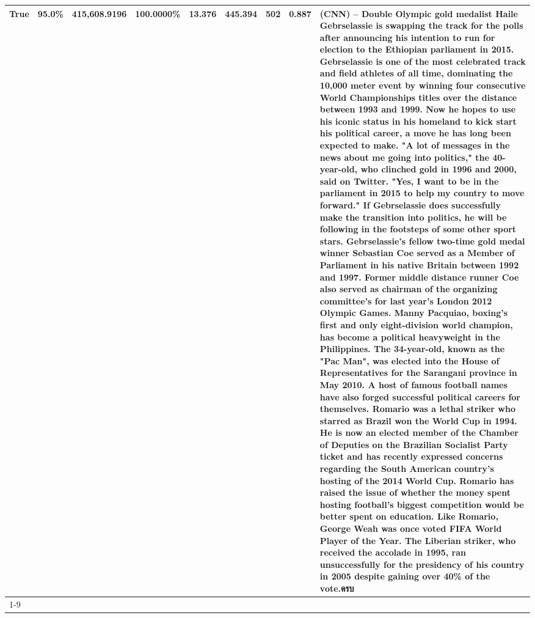 \begin{table}[H]
{\begin{tabular}{lllrlllll}
True & 95.0\% & 415,608.9196 & \bfseries \color{red} 100.0000\% & 13.376 & 445.394 & 502 & 0.887 & (CNN) -- Double Olympic gold medalist Haile Gebrselassie is swapping the track for the polls after announcing his intention to run for election to the Ethiopian parliament in 2015. Gebrselassie is one of the most celebrated track and field athletes of all time, dominating the 10,000 meter event by winning four consecutive World Championships titles over the distance between 1993 and 1999. Now he hopes to use his iconic status in his homeland to kick start his political career, a move he has long been expected to make. "A lot of messages in the news about me going into politics," the 40-year-old, who clinched gold in 1996 and 2000, said on Twitter. "Yes, I want to be in the parliament in 2015 to help my country to move forward." If Gebrselassie does successfully make the transition into politics, he will be following in the footsteps of some other sport stars. Gebrselassie's fellow two-time gold medal winner Sebastian Coe served as a Member of Parliament in his native Britain between 1992 and 1997. Former middle distance runner Coe also served as chairman of the organizing committee's for last year's London 2012 Olympic Games. Manny Pacquiao, boxing's first and only eight-division world champion, has become a political heavyweight in the Philippines. The 34-year-old, known as the "Pac Man", was elected into the House of Representatives for the Sarangani province in May 2010. A host of famous football names have also forged successful political careers for themselves. Romario was a lethal striker who starred as Brazil won the World Cup in 1994. He is now an elected member of the Chamber of Deputies on the Brazilian Socialist Party ticket and has recently expressed concerns regarding the South American country's hosting of the 2014 World Cup. Romario has raised the issue of whether the money spent hosting football's biggest competition would be better spent on education. Like Romario, George Weah was once voted FIFA World Player of the Year. The Liberian striker, who received the accolade in 1995, ran unsuccessfully for the presidency of his country in 2005 despite gaining over 40\% of the vote.ครบ \\
\cline{1-9}

\end{tabular}}
\end{table}
